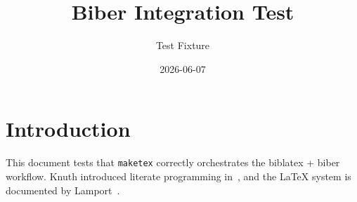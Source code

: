\documentclass{article}
\title{Biber Integration Test}
\author{Test Fixture}
\date{2026-06-07}
\begin{document}
\maketitle

\section{Introduction}

This document tests that \texttt{maketex} correctly orchestrates the
biblatex + biber workflow. Knuth introduced literate programming
in~\cite{knuth1984literate}, and the \LaTeX{} system is documented
by Lamport~\cite{lamport1994latex}.

\printbibliography
\end{document}

